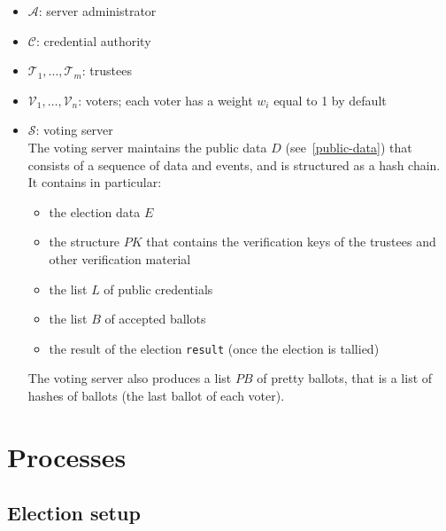 \documentclass[a4paper]{article}
\newcommand{\result}{\texttt{result}}
\begin{document}
\newcommand{\pklabel}{\textsf{public\_key}}
\newcommand{\pok}{\textsf{pok}}
\newcommand{\challenge}{\textsf{challenge}}
\newcommand{\response}{\textsf{response}}
\newcommand{\alphalabel}{\textsf{alpha}}
\newcommand{\betalabel}{\textsf{beta}}
\newcommand{\Hash}{\mathcal{H}}

\begin{itemize}
\item $\mathcal{A}$: server administrator
\item $\mathcal{C}$: credential authority
\item $\mathcal{T}_1,\dots,\mathcal{T}_m$: trustees
\item $\mathcal{V}_1,\dots,\mathcal{V}_n$: voters; each voter has a
    weight $w_i$ equal to 1 by default
\item $\mathcal{S}$: voting server \\
  The voting server maintains the public data $D$ (see~\ref{public-data}) that
consists of a sequence of data and events, and is structured as a
hash chain. It contains in particular:
  \begin{itemize}
  \item the election data $E$
  \item the structure $PK$ that contains the verification keys of the
    trustees and other verification material
  \item the list $L$ of public credentials
  \item the list $B$ of accepted ballots
  \item the result of the election {\result} (once the election is tallied)
  \end{itemize}
  The voting server also produces a list $PB$ of pretty ballots, that
  is a list of hashes of ballots (the last ballot of each voter).
\end{itemize}

\section{Processes}
\label{processes}

\subsection{Election setup}
\label{election-setup}
\end{document}
